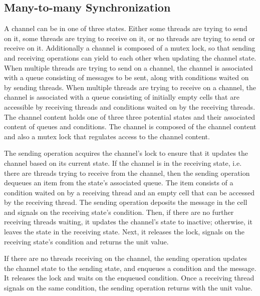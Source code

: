 \documentclass[letterpaper, 11pt]{extarticle}
\begin{document}
\subsection{Many-to-many Synchronization}
A channel can be in one of three states.  Either some threads are trying to send on it,
some threads are trying to receive on it, or no threads are trying to send or receive on it.
Additionally a channel is composed of a mutex lock,
so that sending and receiving operations can yield
to each other when updating the channel state. When multiple threads are trying to send on a
channel, the channel is associated with a queue consisting of messages to be sent, along with
conditions waited on by sending threads. When multiple threads are trying to receive on a
channel, the channel is associated with a queue consisting of
initially empty cells that are accessible by receiving threads and
conditions waited on by the receiving threads.
The channel content holds one of three three potential states and their
associated content of queues and conditions.
The channel is composed of the channel content and also a mutex lock that regulates access to
the channel content.

The sending operation acquires the channel's lock to
ensure that it updates the channel based on
its current state.  If the channel is in the receiving state,
i.e. there are threads trying to receive from the channel,
then the sending operation dequeues an item from the state's associated queue.
The item consists of a condition waited on by a receiving thread and an empty cell
that can be accessed by the receiving thread.
The sending operation deposits the message in the cell and signals on the receiving state's condition.
Then, if there are no further receiving threads waiting, it updates the channel's state to inactive; otherwise,
it leaves the state in the receiving state.
Next, it releases the lock, signals on the receiving state's condition and returns the unit value.

If there are no threads receiving on the
channel, the sending operation updates the channel state to the sending state,
and enqueues a condition and the message.
It releases the lock and waits on the enqueued condition.
Once a receiving thread signals on the same condition,
the sending operation returns with the unit value.
\end{document}
